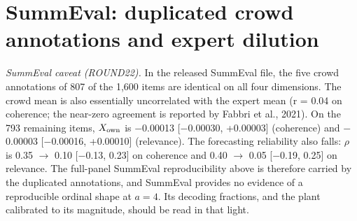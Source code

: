 \documentclass{article}
\begin{document}
\section{SummEval: duplicated crowd annotations and expert dilution}

\emph{SummEval caveat (ROUND22).} In the released SummEval file, the five crowd annotations of 807 of the 1,600 items are identical on all four dimensions. The crowd mean is also essentially uncorrelated with the expert mean (r = 0.04 on coherence; the near-zero agreement is reported by Fabbri et al., 2021). On the 793 remaining items, \(X_{\rm own}\) is $-$0.00013 {[}$-$0.00030, +0.00003{]} (coherence) and $-$0.00003 {[}$-$0.00016, +0.00010{]} (relevance). The forecasting reliability also falls: $\rho$ is 0.35 $\rightarrow$ 0.10 {[}$-$0.13, 0.23{]} on coherence and 0.40 $\rightarrow$ 0.05 {[}$-$0.19, 0.25{]} on relevance. The full-panel SummEval reproducibility above is therefore carried by the duplicated annotations, and SummEval provides no evidence of a reproducible ordinal shape at \(a=4\). Its decoding fractions, and the plant calibrated to its magnitude, should be read in that light.
\end{document}
